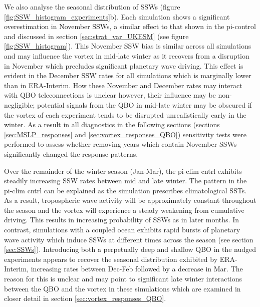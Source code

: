 We also analyse the seasonal distribution of SSWs (figure \ref{fig:SSW_histogram_experiments}b). Each simulation shows a significant overestimation in November SSWs, a similar effect to that shown in the pi-control and discussed in section \ref{sec:strat_var_UKESM} (see figure \ref{fig:SSW_histogram}). This November SSW bias is similar across all simulations and may influence the vortex in mid-late winter as it recovers from a disruption in November which precludes significant planetary wave driving. This effect is evident in the December SSW rates for all simulations which is marginally lower than in ERA-Interim. How these November and December rates may interact with QBO teleconnections is unclear however, their influence may be non-negligible; potential signals from the QBO in mid-late winter may be obscured if the vortex of each experiment tends to be disrupted unrealistically early in the winter. As a result in all diagnostics in the following sections (sections \ref{sec:MSLP_responses} and \ref{sec:vortex_responses_QBO}) sensitivity tests were performed to assess whether removing years which contain November SSWs significantly changed the response patterns.  

Over the remainder of the winter season (Jan-Mar), the pi-clim cntrl exhibits steadily increasing SSW rates between mid and late winter. The pattern in the pi-clim cntrl can be explained as the simulation prescribes climatological SSTs. As a result, tropospheric wave activity will be approximately constant throughout the season and the vortex will experience a steady weakening from cumulative driving. This results in increasing probability of SSWs as in later months. In contrast, simulations with a coupled ocean exhibits rapid bursts of planetary wave activity which induce SSWs at different times across the season (see section \ref{sec:SSWs}). Introducing both a perpetually deep and shallow QBO in the nudged experiments appears to recover the seasonal distribution exhibited by ERA-Interim, increasing rates between Dec-Feb followed by a decrease in Mar. The reason for this is unclear and may point to significant late winter interactions between the QBO and the vortex in these simulations which are examined in closer detail in section \ref{sec:vortex_responses_QBO}.

